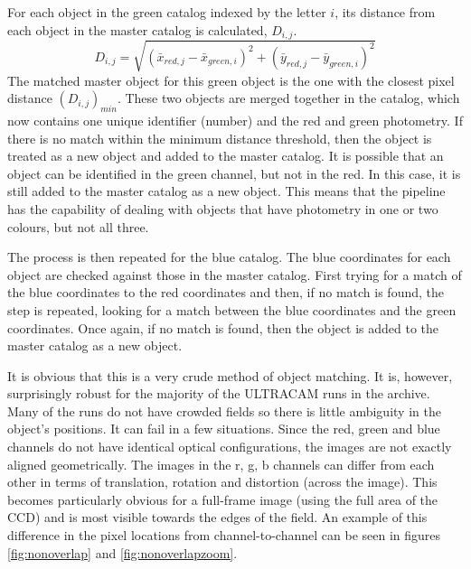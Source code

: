 For each object in the green catalog indexed by the letter $i$, its distance from each object in the master catalog is calculated, $D_{i,j}$. 
\begin{equation}D_{i,j} = \sqrt{(\bar{x}_{red, j}-\bar{x}_{green, i})^2 + (\bar{y}_{red, j}-\bar{y}_{green, i})^2}\end{equation} 
The matched master object for this green object is the one with the closest pixel distance $(D_{i,j})_{min}$. These two objects are merged together in the catalog, which now contains one unique identifier (number) and the red and green photometry. If there is no match within the minimum distance threshold, then the object is treated as a new object and added to the master catalog. It is possible that an object can be identified in the green channel, but not in the red. In this case, it is still added to the master catalog as a new object. This means that the pipeline has the capability of dealing with objects that have photometry in one or two colours, but not all three. 

The process is then repeated for the blue catalog. The blue coordinates for each object are checked against those in the master catalog. First trying for a match of the blue coordinates to the red coordinates and then, if no match is found, the step is repeated, looking for a match between the blue coordinates and the green coordinates. Once again, if no match is found, then the object is added to the master catalog as a new object.  

It is obvious that this is a very crude method of object matching. It is, however, surprisingly robust for the majority of the ULTRACAM runs in the archive. Many of the runs do not have crowded fields so there is little ambiguity in the object's positions. It can fail in a few situations. Since the red, green and blue channels do not have identical optical configurations, the images are not exactly aligned geometrically. The images in the r, g, b channels can differ from each other in terms of translation, rotation and distortion (across the image). This becomes particularly obvious for a full-frame image (using the full area of the CCD) and is most visible towards the edges of the field. An example of this difference in the pixel locations from channel-to-channel can be seen in figures \ref{fig:nonoverlap} and \ref{fig:nonoverlapzoom}.

